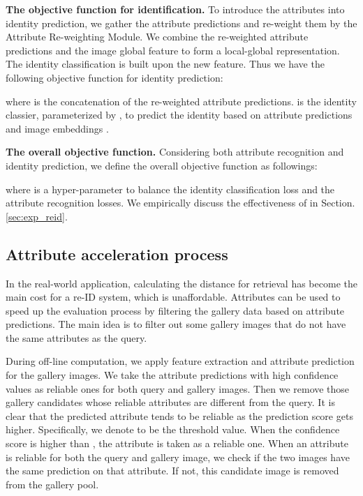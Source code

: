 \documentclass[5p,times,twocolumn]{elsarticle}
\begin{document}
\textbf{The objective function for identification.}
To introduce the attributes into identity prediction, we gather the attribute predictions  and re-weight them by the Attribute Re-weighting Module. We combine the re-weighted attribute predictions  and the image global feature  to form a local-global representation.
The identity classification is built upon the new feature. Thus we have the following objective function for identity prediction:
    
    
    


\noindent
where  is the concatenation of the re-weighted attribute predictions.
 is the identity classier, parameterized by , to predict the identity based on attribute predictions  and image embeddings . 


\textbf{The overall objective function.} Considering both attribute recognition and identity prediction, we define the overall objective function as followings:





\noindent
where  is a hyper-parameter to balance the identity classification loss and the attribute recognition losses. We empirically discuss the effectiveness of  in Section.\ref{sec:exp_reid}.

\subsection{Attribute acceleration process}\label{sec:accelerate}
In the real-world application, calculating the distance for retrieval has become the main cost for a re-ID system, which is unaffordable. 
Attributes can be used to speed up the evaluation process by filtering the gallery data based on attribute predictions. The main idea is to filter out some gallery images that do not have the same attributes as the query. 





During off-line computation, we apply feature extraction and attribute prediction for the gallery images. We take the attribute predictions with high confidence values as reliable ones for both query and gallery images. Then we remove those gallery candidates whose reliable attributes are different from the query. It is clear that the predicted attribute tends to be reliable as the prediction score gets higher. Specifically, we denote  to be the threshold value. When the confidence score is higher than , the attribute is taken as a reliable one. When an attribute is reliable for both the query and gallery image, we check if the two images have the same prediction on that attribute. If not, this candidate image is removed from the gallery pool.
\end{document}
